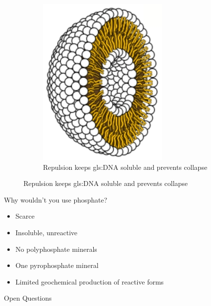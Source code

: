 \documentclass[]{article}
\begin{document}
\begin{figure}[H]
	\begin{subfigure}[b]{0.45\textwidth}
		\centering
		\caption{Repulsion keeps \gls{gls:DNA} soluble and prevents collapse}\label{fig:PhosphoLipid3} 
		\includegraphics[width=\textwidth]{PhosphoLipid3}
	\end{subfigure}
	
\end{figure}

Why wouldn't you use phosphate?

\begin{itemize}
	\item Scarce
	\item Insoluble, unreactive
	\item No polyphosphate minerals
	\item One pyrophosphate mineral
	\item Limited geochemical production of reactive forms
\end{itemize}
Open Questions
\end{document}
